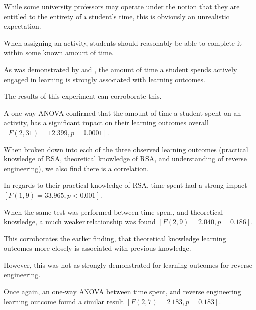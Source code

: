 While some university professors may operate under the notion that they are entitled to the entirety of a student's time, this is obviously an unrealistic expectation. %



When assigning an activity, students should reasonably be able to complete it within some known amount of time. 



        



        As was demonstrated by \citeauthor{C-Linehan} and \citeauthor{Z-Zeng}, the amount of time a student spends actively engaged in learning is strongly associated with learning outcomes. %



The results of this experiment can corroborate this. %



A one-way ANOVA confirmed that the amount of time a student spent on an activity, has a significant impact on their learning outcomes overall $[F(2,31)=12.399, p=0.0001]$.



        



        When broken down into each of the three observed learning outcomes (practical knowledge of RSA, theoretical knowledge of RSA, and understanding of reverse engineering), we also find there is a correlation. %



In regards to their practical knowledge of RSA, time spent had a strong impact $[F(1,9)=33.965, p<0.001]$. %



When the same test was performed between time spent, and theoretical knowledge, a much weaker relationship was found $[F(2, 9)=2.040, p=0.186]$. %



This corroborates the earlier finding, that theoretical knowledge learning outcomes more closely is associated with previous knowledge. %



However, this was not as strongly demonstrated for learning outcomes for reverse engineering. %



Once again, an one-way ANOVA between time spent, and reverse engineering learning outcome found a similar result $[F(2, 7)=2.183, p=0.183]$. 







